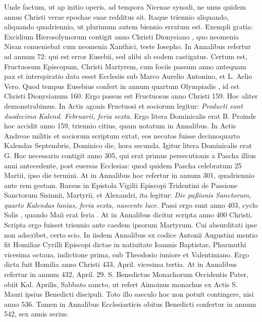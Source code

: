 Unde factum, ut ap initio operis,
ad tempora Nicenae synodi, ne unus quidem annus Christi
verae epochae suae redditus sit.
Itaque triennio aliquando, aliquando
quadriennio, ut plurimum autem biennio erratum est.
Exempli
gratia: Excidium Hierosolymorum contigit anno Christi
Dionysiano , quo neomenia Nisan conueniebat cum neomenia
Xanthici, teste Iosepho.
In Annalibus refertur ad annum
72: qui est error Eusebii, sed alibi ab eodem castigatus.
Certum est, Fructuosum Episcopum, Christi Martyrem, cum fociis
passum anno antequam pax et interspiratio data esset Ecclesiis
sub Marco Aurelio Antonino, et L. Aelio Vero.
Quod tempus Eusebius confert in annum quartum Olympiadis
 ,
id est Christi Dionysianum 160.
Ergo passus est Fructuosus anno Christi
159.
Hoc aliter demonstrabimus.
In Actis agonis Fructuosi et
sociorum legitur: \textit{Producti sunt duodecimo Kalend. Februarii, feria
sexta.}
Ergo litera Dominicalis erat B.
Proinde hoc accidit anno
159, triennio citius, quam notatum in Annalibus.
In Actis Andreae
militis et sociorum scriptum extat, eos necatos fuisse decimoquarto
Kalendas Septembris, Dominico die, hora secunda.
Igitur litera Dominicalis erat G.
Hoc necessario contigit anno 305,
qui erat primus persecutionis a Pascha illius anni antecedente, post
euersas Ecclesias: quod quidem Pascha celebratum 25 Martii, ipso
die termini.
At in Annalibus hoc refertur in annum 301, quadriennio
ante rem gestam.
Rursus in Epistola Vigilii Episcopi Tridentini
de Passione Sanctorum Sisinnii, Martyrii, et Alexandri,
ita legitur: \textit{Die paßionis Sanctorum, quarto Kalendas lunias, feria
sexta, nascente luce.}
Passi ergo sunt anno 403, cyclo Solis , quando
 Maii erat feria .
At in Annalibus dicitur scripta
anno 400 Christi.
Scripta ergo fuisset triennio ante caedem
ipsorum Martyrum.
Cui absurditati ipse non adscribet, certo scio.
In iisdem
Annalibus ex codice Antonii Augustini mentio fit Homiliae
Cyrilli Episcopi dictae in natiuitate Ioannis Baptistae, Pharmuthi
vicesima octaua, indictione prima, sub Theodosio iuniore et Valentiniano.
Ergo dicta fuit Homilia anno Christi 433, April. vicesima
tertia.
At in Annalibus refertur in annum 432, April. 29. S. Benedictus
Monachorum Occidentis Pater, obiit  Kal. Aprilis, Sabbato
sancto, ut refert Aimoinus monachus ex Actis S. Mauri ipsius
Benedicti discipuli.
Toto illo saeculo hoc non potuit contingere, nisi
anno 536.
Tamen in Annalibus Ecclesiasticis obitus Benedicti confertur
in annum 542, sex annis serius.

